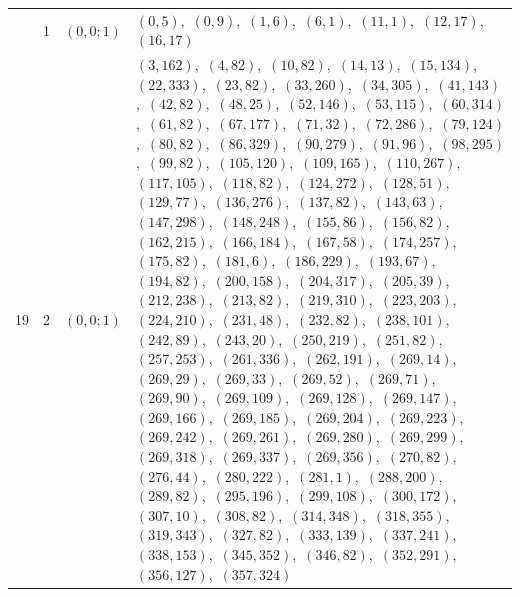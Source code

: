 \documentclass[11pt]{article}
\begin{document}
\begin{longtable}{@{}rrl>{\raggedright\arraybackslash}p{}@{}}
\addlinespace[3pt]
19 & 1 & $(0,0;1)$ & $(0,5)$,\allowbreak\ $(0,9)$,\allowbreak\ $(1,6)$,\allowbreak\ $(6,1)$,\allowbreak\ $(11,1)$,\allowbreak\ $(12,17)$,\allowbreak\ $(16,17)$\\
19 & 2 & $(0,0;1)$ & $(3,162)$,\allowbreak\ $(4,82)$,\allowbreak\ $(10,82)$,\allowbreak\ $(14,13)$,\allowbreak\ $(15,134)$,\allowbreak\ $(22,333)$,\allowbreak\ $(23,82)$,\allowbreak\ $(33,260)$,\allowbreak\ $(34,305)$,\allowbreak\ $(41,143)$,\allowbreak\ $(42,82)$,\allowbreak\ $(48,25)$,\allowbreak\ $(52,146)$,\allowbreak\ $(53,115)$,\allowbreak\ $(60,314)$,\allowbreak\ $(61,82)$,\allowbreak\ $(67,177)$,\allowbreak\ $(71,32)$,\allowbreak\ $(72,286)$,\allowbreak\ $(79,124)$,\allowbreak\ $(80,82)$,\allowbreak\ $(86,329)$,\allowbreak\ $(90,279)$,\allowbreak\ $(91,96)$,\allowbreak\ $(98,295)$,\allowbreak\ $(99,82)$,\allowbreak\ $(105,120)$,\allowbreak\ $(109,165)$,\allowbreak\ $(110,267)$,\allowbreak\ $(117,105)$,\allowbreak\ $(118,82)$,\allowbreak\ $(124,272)$,\allowbreak\ $(128,51)$,\allowbreak\ $(129,77)$,\allowbreak\ $(136,276)$,\allowbreak\ $(137,82)$,\allowbreak\ $(143,63)$,\allowbreak\ $(147,298)$,\allowbreak\ $(148,248)$,\allowbreak\ $(155,86)$,\allowbreak\ $(156,82)$,\allowbreak\ $(162,215)$,\allowbreak\ $(166,184)$,\allowbreak\ $(167,58)$,\allowbreak\ $(174,257)$,\allowbreak\ $(175,82)$,\allowbreak\ $(181,6)$,\allowbreak\ $(186,229)$,\allowbreak\ $(193,67)$,\allowbreak\ $(194,82)$,\allowbreak\ $(200,158)$,\allowbreak\ $(204,317)$,\allowbreak\ $(205,39)$,\allowbreak\ $(212,238)$,\allowbreak\ $(213,82)$,\allowbreak\ $(219,310)$,\allowbreak\ $(223,203)$,\allowbreak\ $(224,210)$,\allowbreak\ $(231,48)$,\allowbreak\ $(232,82)$,\allowbreak\ $(238,101)$,\allowbreak\ $(242,89)$,\allowbreak\ $(243,20)$,\allowbreak\ $(250,219)$,\allowbreak\ $(251,82)$,\allowbreak\ $(257,253)$,\allowbreak\ $(261,336)$,\allowbreak\ $(262,191)$,\allowbreak\ $(269,14)$,\allowbreak\ $(269,29)$,\allowbreak\ $(269,33)$,\allowbreak\ $(269,52)$,\allowbreak\ $(269,71)$,\allowbreak\ $(269,90)$,\allowbreak\ $(269,109)$,\allowbreak\ $(269,128)$,\allowbreak\ $(269,147)$,\allowbreak\ $(269,166)$,\allowbreak\ $(269,185)$,\allowbreak\ $(269,204)$,\allowbreak\ $(269,223)$,\allowbreak\ $(269,242)$,\allowbreak\ $(269,261)$,\allowbreak\ $(269,280)$,\allowbreak\ $(269,299)$,\allowbreak\ $(269,318)$,\allowbreak\ $(269,337)$,\allowbreak\ $(269,356)$,\allowbreak\ $(270,82)$,\allowbreak\ $(276,44)$,\allowbreak\ $(280,222)$,\allowbreak\ $(281,1)$,\allowbreak\ $(288,200)$,\allowbreak\ $(289,82)$,\allowbreak\ $(295,196)$,\allowbreak\ $(299,108)$,\allowbreak\ $(300,172)$,\allowbreak\ $(307,10)$,\allowbreak\ $(308,82)$,\allowbreak\ $(314,348)$,\allowbreak\ $(318,355)$,\allowbreak\ $(319,343)$,\allowbreak\ $(327,82)$,\allowbreak\ $(333,139)$,\allowbreak\ $(337,241)$,\allowbreak\ $(338,153)$,\allowbreak\ $(345,352)$,\allowbreak\ $(346,82)$,\allowbreak\ $(352,291)$,\allowbreak\ $(356,127)$,\allowbreak\ $(357,324)$\\

\end{longtable}
\end{document}
